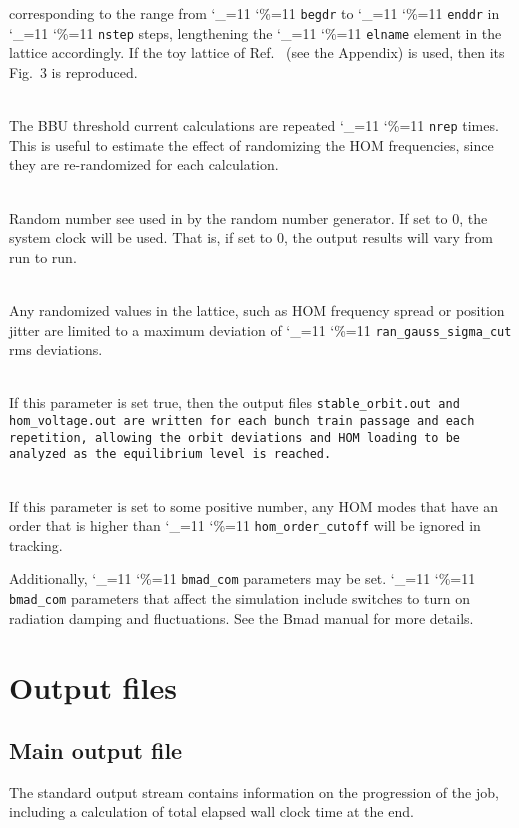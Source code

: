 \documentclass[11pt]{article}
\newcommand\ttcmd{\begingroup\catcode`\_=11 \catcode`\%=11 \dottcmd}
\newcommand\dottcmd[1]{\texttt{#1}\endgroup}
\newcommand{\vn}{\ttcmd}
\newcommand{\Newline}{\hfil \\}
\begin{document}
{\begin{description}
corresponding to the range from \vn{begdr} to \vn{enddr} in  \vn{nstep} steps,
lengthening the \vn{elname} element in the lattice accordingly. If the toy lattice
of Ref.~\cite{ref:Hoffstaetter04} (see the Appendix) is used, then its Fig.~3 is reproduced.
  \item[\vn{nrep}] \Newline
The BBU threshold current calculations are repeated \vn{nrep} times. This is useful
to estimate the effect of randomizing the HOM frequencies, since they are re-randomized for
each calculation.
  \item[\vn{ran_seed}] \Newline
Random number see used in by the random number generator. If set to 0, the system clock
will be used. That is, if set to 0, the output results will vary from run to run. 
  \item[\vn{ran_gauss_sigma_cut}] \Newline
Any randomized values in the lattice, such as HOM frequency spread or position jitter
are limited to a maximum deviation of \vn{ran_gauss_sigma_cut} rms deviations. 
  \item[\vn{stable_orbit_anal}] \Newline
If this parameter is set true, then the output files \tt{stable_orbit.out} and \tt{hom_voltage.out}
are written for each bunch train passage and each repetition, allowing the orbit deviations
and HOM loading to be analyzed as the equilibrium level is reached.
  \item[\vn{hom_order_cutoff}] \Newline
If this parameter is set to some positive number, any HOM modes that have an order that
is higher than \vn{hom_order_cutoff} will be ignored in tracking.
\end{description}

Additionally, \vn{bmad_com} parameters may be set. \vn{bmad_com}
parameters that affect the simulation include switches to turn on
radiation damping and fluctuations. See the Bmad\cite{ref:bmad} manual
for more details.

\section{Output files} 

\subsection{Main output file}
The standard output stream contains information on the progression of the job,
including a calculation of total elapsed wall clock time at the end.
}
\end{document}
